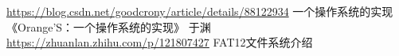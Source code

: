 \documentclass[12pt,a4paper,UTF8]{ctexart}
\begin{document}
\begin{figure}[htbp]
\centering
{}
\end{figure}

\begin{thebibliography}{1}
 \href{https://blog.csdn.net/goodcrony/article/details/88122934}
{https://blog.csdn.net/goodcrony/article/details/88122934}
一个操作系统的实现
 《Orange'S：一个操作系统的实现》 于渊
 \href{https://zhuanlan.zhihu.com/p/121807427}
{https://zhuanlan.zhihu.com/p/121807427}
FAT12文件系统介绍
\end{thebibliography}
\end{document}
